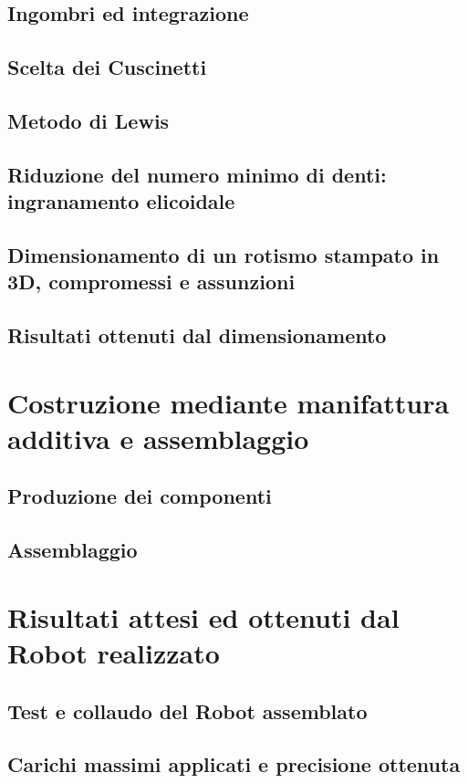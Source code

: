 \documentclass[%
corpo=11pt,
twoside,
 stile=classica,
oldstyle,
greek,%
]{toptesi}
\begin{document}
	\section{Ingombri ed integrazione}
	\section{Scelta dei Cuscinetti}
	\section{Metodo di Lewis}
	\section{Riduzione del numero minimo di denti: ingranamento elicoidale}
	\section{Dimensionamento di un rotismo stampato in 3D, compromessi e assunzioni}
	\section{Risultati ottenuti dal dimensionamento}

\chapter{Costruzione mediante manifattura additiva e assemblaggio}

	\section{Produzione dei componenti}
	\section{Assemblaggio}
	
\chapter{Risultati attesi ed ottenuti dal Robot realizzato}
	\section{Test e collaudo del Robot assemblato}
	\section{Carichi massimi applicati e precisione ottenuta}
\end{document}
